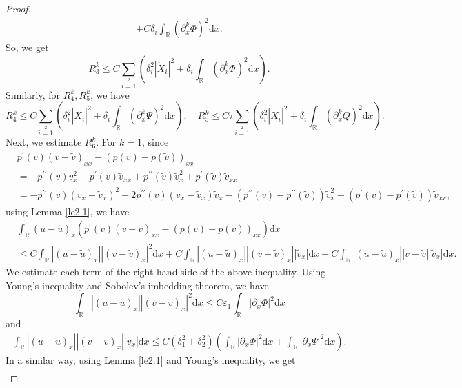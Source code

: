 \documentclass[10pt,a4paper]{amsart}
\newcommand{\dif}{\mathrm{d}}
\begin{document}
\begin{proof}
\begin{align*}
+C\delta_i\int_\mathbb{R}(\partial_{x}^k\Phi)^2 \dif x.
\end{align*}
So, we get
\[
R^k_3\le C\sum\limits_{i=1}\limits^2\left(\delta_i^2|\dot{X}_i|^2
+\delta_i\int_\mathbb{R}(\partial_{x}^k\Phi)^2 \dif x\right).
\]
Similarly, for $R^k_4,R^k_5$, we have
\[
R^k_4\le C\sum\limits_{i=1}\limits^2\left(\delta_i^2|\dot{X}_i|^2
+\delta_i\int_\mathbb{R}(\partial_{x}^k\Psi)^2 \dif x\right),\quad
R^k_5\le C\tau\sum\limits_{i=1}\limits^2\left(\delta_i^2|\dot{X}_i|^2
+\delta_i\int_\mathbb{R}(\partial_{x}^kQ)^2 \dif x\right).
\]
Next, we estimate $R_6^k$. For $k=1$, since
\begin{align*}
  &p^{\prime}(v)(v-\widetilde{v})_{xx}-(p(v)-p(\widetilde{v}))_{xx}\\
   &=-p^{\prime\prime}(v)v^2_{x}-p^{\prime}(v)\widetilde{v}_{xx}
                    +p^{\prime\prime}(\widetilde{v})\widetilde{v}^2_{x}
                    +p^{\prime}(\widetilde{v})\widetilde{v}_{xx}\\
   &=-p^{\prime\prime}(v)(v_{x}-\widetilde{v}_{x})^2
   -2p^{\prime\prime}(v)(v_{x}-\widetilde{v}_{x})\widetilde{v}_{x}
     -(p^{\prime\prime}(v)-p^{\prime\prime}(\widetilde{v}))\widetilde{v}^2_{x}
     -(p^{\prime}(v)-p^{\prime}(\widetilde{v}))\widetilde{v}_{xx},
\end{align*}
using Lemma \ref{le2.1}, we have
\begin{align*}
 &\int_\mathbb{R}(u-\widetilde{u})_{x}(p^{\prime}(v)(v-\widetilde{v})_{xx}-(p(v)-p(\widetilde{v}))_{xx})\dif x\\
      &\leq C\int_\mathbb{R}|(u-\widetilde{u})_{x}||(v-\widetilde{v})_{x}|^2\dif x
      +C\int_\mathbb{R}|(u-\widetilde{u})_{x}||(v-\widetilde{v})_{x}||\widetilde{v}_{x}|\dif x
      +C\int_\mathbb{R}|(u-\widetilde{u})_{x}||v-\widetilde{v}||\widetilde{v}_{x}|\dif x.
\end{align*}
We estimate each term of the right hand side of the above inequality. Using Young's inequality and Sobolev's imbedding theorem, we have
\[
\int_\mathbb{R}|(u-\widetilde{u})_{x}||(v-\widetilde{v})_{x}|^2\dif x\leq
 C\varepsilon_1\int_\mathbb{R}|\partial_{x}\Phi|^2\dif x
\]
and
\begin{align*}
\int_\mathbb{R}|(u-\widetilde{u})_{x}||(v-\widetilde{v})_{x}||\widetilde{v}_{x}|\dif x\leq C(\delta_1^2+\delta_2^2)
(\int_\mathbb{R}|\partial_{x}\Phi|^2\dif x+\int_\mathbb{R}|\partial_{x}\Psi|^2\dif x).
\end{align*}
In a similar way, using Lemma \ref{le2.1} and Young's inequality, we get
\begin{align*}

\end{align*}
\end{proof}
\end{document}
